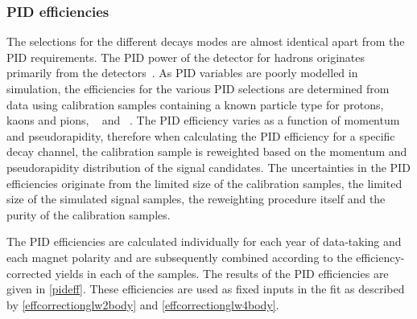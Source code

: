\subsubsection{PID efficiencies}
\label{sec:cpfit:efficiencies:pid}

The selections for the different \Dz decays modes are almost identical apart from the PID requirements. The PID power of the detector for hadrons originates primarily from the \rich detectors~\cite{LHCb-DP-2012-003,richrun2}. As PID variables are poorly modelled in \lhcb simulation, the efficiencies for the various PID selections are determined from data using calibration samples containing a known particle type for protons, kaons and pions, \eg~\decay{\Dz}{\Km\pip} and \decay{\KS}{\pim\pip}~\cite{LHCb-PUB-2016-021,LHCb-PUB-2016-005}. The PID efficiency varies as a function of momentum and pseudorapidity, therefore when calculating the PID efficiency for a specific decay channel, the calibration sample is reweighted based on the momentum and pseudorapidity distribution of the signal candidates. The uncertainties in the PID efficiencies originate from the limited size of the calibration samples, the limited size of the simulated signal samples, the reweighting procedure itself and the purity of the calibration samples.

The PID efficiencies are calculated individually for each year of data-taking and each magnet polarity and are subsequently combined according to the efficiency-corrected yields in each of the samples. The results of the PID efficiencies are given in \tab\ref{pideff}. These efficiencies are used as fixed inputs in the \CP fit as described by \eqns\ref{effcorrectionglw2body} and \ref{effcorrectionglw4body}. 

\begin{table}[h]
\centering
{}
\caption{Summary of the PID efficiencies used in the \CP fit.}
\label{pideff}
\end{table}

